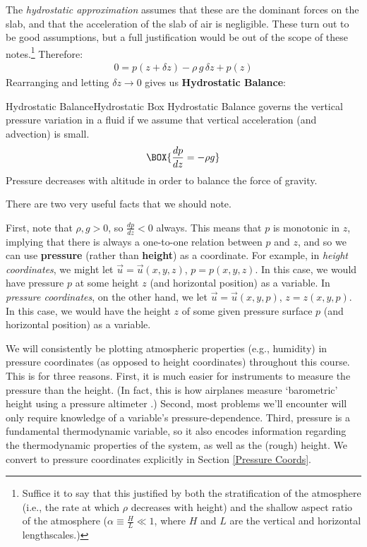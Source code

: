 The \textit{hydrostatic approximation} assumes that these are the dominant forces on the slab, and that the acceleration of the slab of air is negligible. These turn out to be good assumptions, but a full justification would be out of the scope of these notes.\footnote{
    Suffice it to say that this justified by both the stratification of the atmosphere (i.e., the rate at which \(\rho\) decreases with height) and the shallow aspect ratio of the atmosphere (\(\alpha \equiv \frac{H}{L} \ll 1\), where \(H\) and \(L\) are the vertical and horizontal lengthscales.)
} Therefore:
\begin{align*}
    0=p(z+\delta z)-\rho\, g\,\delta z+p(z)
\end{align*}
Rearranging and letting \(\delta z\to0\) gives us \textbf{Hydrostatic Balance}:
\begin{fact}{Hydrostatic Balance}{Hydrostatic Box}\label{Hydrostatic Box}
Hydrostatic Balance governs the vertical pressure variation in a fluid if we assume that vertical acceleration (and advection) is small.
    \begin{equation}\label{Hydrostatic Balance}
    \BOX{
        \frac{dp}{dz}=-\rho g
    }
    \end{equation}
Pressure decreases with altitude in order to balance the force of gravity.
\end{fact}
\noindent There are two very useful facts that we should note.

First, note that \(\rho,g>0\), so \(\frac{dp}{dz}<0\) always. This means that \(p\) is monotonic in \(z\), implying that there is always a one-to-one relation between \(p\) and \(z\), and so we can use \textbf{pressure} (rather than \textbf{height}) as a coordinate. For example, in \textit{height coordinates}, we might let \(\vec{u}=\vec{u}(x,y,z)\), \(p=p(x,y,z)\). In this case, we would have pressure \(p\) at some height \(z\) (and horizontal position) as  a variable. In \textit{pressure coordinates}, on the other hand, we let \(\vec{u}=\vec{u}(x,y,p)\), \(z=z(x,y,p)\). In this case, we would have the height \(z\) of some given pressure surface \(p\) (and horizontal position) as a variable.

We will consistently be plotting atmospheric properties (e.g., humidity) in pressure coordinates (as opposed to height coordinates) throughout this course. This is for three reasons. First, it is much easier for instruments to measure the pressure than the height. (In fact, this is how airplanes measure `barometric' height using a pressure altimeter \cite{Altimeter}.) Second, most problems we'll encounter will only require knowledge of a variable's pressure-dependence. Third, pressure is a fundamental thermodynamic variable, so it also encodes information regarding the thermodynamic properties of the system, as well as the (rough) height. We convert to pressure coordinates explicitly in Section \ref{Pressure Coords}.

